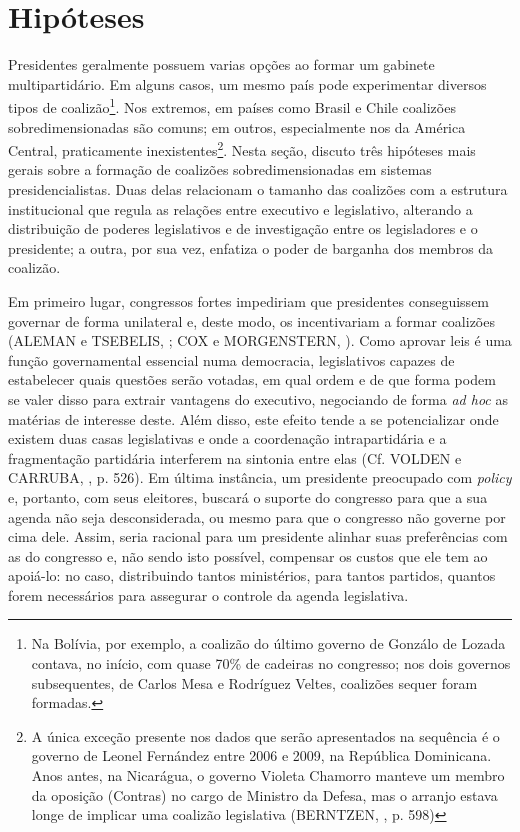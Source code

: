\section{Hipóteses}
\label{sec:hipoteses}

Presidentes geralmente possuem varias opções ao formar um gabinete multipartidário. Em alguns casos, um mesmo país pode experimentar diversos tipos de coalizão\footnote{Na Bolívia, por exemplo, a coalizão do último governo de Gonzálo de Lozada contava, no início, com quase 70\% de cadeiras no congresso; nos dois governos subsequentes, de Carlos Mesa e Rodríguez Veltes, coalizões sequer foram formadas.}. Nos extremos, em países como Brasil e Chile coalizões sobredimensionadas são comuns; em outros, especialmente nos da América Central, praticamente inexistentes\footnote{A única exceção presente nos dados que serão apresentados na sequência é o governo de Leonel Fernández entre 2006 e 2009, na República Dominicana. Anos antes, na Nicarágua, o governo Violeta Chamorro manteve um membro da oposição (Contras) no cargo de Ministro da Defesa, mas o arranjo estava longe de implicar uma coalizão legislativa (BERNTZEN, \citeyear{berntzen1993}, p. 598)}. Nesta seção, discuto três hipóteses mais gerais sobre a formação de coalizões sobredimensionadas em sistemas presidencialistas. Duas delas relacionam o tamanho das coalizões com a estrutura institucional que regula as relações entre executivo e legislativo, alterando a distribuição de poderes legislativos e de investigação entre os legisladores e o presidente; a outra, por sua vez, enfatiza o poder de barganha dos membros da coalizão.

Em primeiro lugar, congressos fortes impediriam que presidentes conseguissem governar de forma unilateral e, deste modo, os incentivariam a formar coalizões (ALEMAN e TSEBELIS, \citeyear{aleman2011}; COX e MORGENSTERN, \citeyear{cox2001}). Como aprovar leis é uma função governamental essencial numa democracia, legislativos capazes de estabelecer quais questões serão votadas, em qual ordem e de que forma podem se valer disso para extrair vantagens do executivo, negociando de forma \textit{ad hoc} as matérias de interesse deste. Além disso, este efeito tende a se potencializar onde existem duas casas legislativas e onde a coordenação intrapartidária e a fragmentação partidária interferem na sintonia entre elas (Cf. VOLDEN e CARRUBA, \citeyear{volden2004}, p. 526). Em última instância, um presidente preocupado com \textit{policy} e, portanto, com seus eleitores, buscará o suporte do congresso para que a sua agenda não seja desconsiderada, ou mesmo para que o congresso não governe por cima dele. Assim, seria racional para um presidente alinhar suas preferências com as do congresso e, não sendo isto possível, compensar os custos que ele tem ao apoiá-lo: no caso, distribuindo tantos ministérios, para tantos partidos, quantos forem necessários para assegurar o controle da agenda legislativa. 

